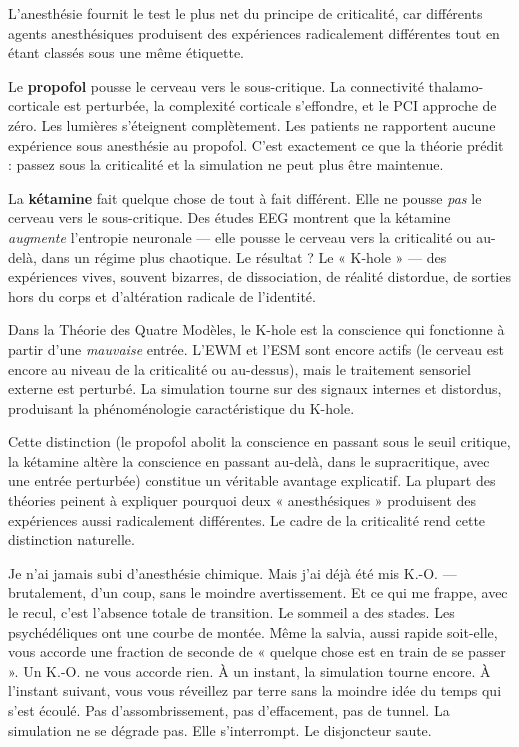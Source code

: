 \documentclass[11pt, twoside, openright]{book}
\begin{document}
L'anesthésie fournit le test le plus net du principe de criticalité, car différents agents anesthésiques produisent des expériences radicalement différentes tout en étant classés sous une même étiquette.

Le \textbf{propofol} pousse le cerveau vers le sous-critique. La connectivité thalamo-corticale est perturbée, la complexité corticale s'effondre, et le PCI approche de zéro. Les lumières s'éteignent complètement. Les patients ne rapportent aucune expérience sous anesthésie au propofol. C'est exactement ce que la théorie prédit : passez sous la criticalité et la simulation ne peut plus être maintenue.

La \textbf{kétamine} fait quelque chose de tout à fait différent. Elle ne pousse \textit{pas} le cerveau vers le sous-critique. Des études EEG montrent que la kétamine \textit{augmente} l'entropie neuronale --- elle pousse le cerveau vers la criticalité ou au-delà, dans un régime plus chaotique. Le résultat ? Le « K-hole » --- des expériences vives, souvent bizarres, de dissociation, de réalité distordue, de sorties hors du corps et d'altération radicale de l'identité.

Dans la Théorie des Quatre Modèles, le K-hole est la conscience qui fonctionne à partir d'une \textit{mauvaise} entrée. L'EWM et l'ESM sont encore actifs (le cerveau est encore au niveau de la criticalité ou au-dessus), mais le traitement sensoriel externe est perturbé. La simulation tourne sur des signaux internes et distordus, produisant la phénoménologie caractéristique du K-hole.

Cette distinction (le propofol abolit la conscience en passant sous le seuil critique, la kétamine altère la conscience en passant au-delà, dans le supracritique, avec une entrée perturbée) constitue un véritable avantage explicatif. La plupart des théories peinent à expliquer pourquoi deux « anesthésiques » produisent des expériences aussi radicalement différentes. Le cadre de la criticalité rend cette distinction naturelle.

Je n'ai jamais subi d'anesthésie chimique. Mais j'ai déjà été mis K.-O. --- brutalement, d'un coup, sans le moindre avertissement. Et ce qui me frappe, avec le recul, c'est l'absence totale de transition. Le sommeil a des stades. Les psychédéliques ont une courbe de montée. Même la salvia, aussi rapide soit-elle, vous accorde une fraction de seconde de « quelque chose est en train de se passer ». Un K.-O. ne vous accorde rien. À un instant, la simulation tourne encore. À l'instant suivant, vous vous réveillez par terre sans la moindre idée du temps qui s'est écoulé. Pas d'assombrissement, pas d'effacement, pas de tunnel. La simulation ne se dégrade pas. Elle s'interrompt. Le disjoncteur saute.
\end{document}
